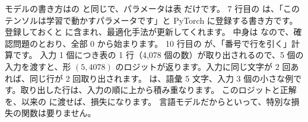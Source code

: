 \par{} %

モデルの書き方はの  と同じで、パラメータは表  だけです。
7 行目の  は、「このテンソルは学習で動かすパラメータです」と PyTorch に登録する書き方です。
登録しておくと  に含まれ、最適化手法が更新してくれます。
中身は  なので、確認問題のとおり、全部 0 から始まります。
10 行目の  が、「番号で行を引く」計算です。
入力 1 個につき表の 1 行（4,078 個の数）が取り出されるので、5 個の入力を渡すと、形 $(5,4078)$ のロジットが返ります。入力に同じ文字が 2 回あれば、同じ行が 2 回取り出されます。
は、語彙 5 文字、入力 3 個の小さな例です。取り出した行は、入力の順に上から積み重なります。%
このロジットと正解を、以来の  に渡せば、損失になります。
言語モデルだからといって、特別な損失の関数は要りません。

